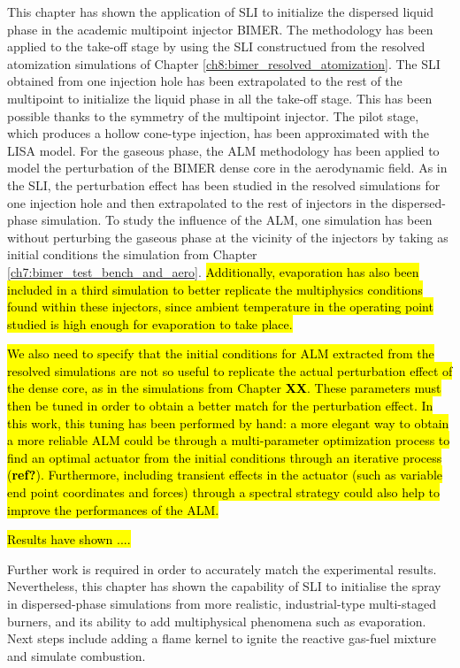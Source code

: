 This chapter has shown the application of SLI to initialize the dispersed liquid phase in the academic multipoint injector BIMER. The methodology has been applied to the take-off stage by using the SLI constructued from the resolved atomization simulations of Chapter \ref{ch8:bimer_resolved_atomization}. The SLI obtained from one injection hole has been extrapolated to the rest of the multipoint to initialize the liquid phase in all the take-off stage. This has been possible thanks to the symmetry of the multipoint injector. The pilot stage, which produces a hollow cone-type injection, has been approximated with the LISA 
model. For the gaseous phase, the ALM methodology has been applied to model the perturbation of the BIMER dense core in the aerodynamic field. As in the SLI, the perturbation effect has been studied in the resolved simulations for one injection hole and then extrapolated to the rest of injectors in the dispersed-phase simulation. To study the influence of the ALM, one simulation has been without perturbing the gaseous phase at the vicinity of the injectors by taking as initial conditions the simulation from Chapter \ref{ch7:bimer_test_bench_and_aero}. \hl{Additionally, evaporation has also been included in a third simulation to better replicate the multiphysics conditions found within these injectors, since ambient temperature in the operating point studied is high enough for evaporation to take place.}

\hl{We also need to specify that the initial conditions for ALM extracted from the resolved simulations are not so useful to replicate the actual perturbation effect of the dense core, as in the simulations from Chapter \textbf{XX}. These parameters must then be tuned in order to obtain a better match for the perturbation effect. In this work, this tuning has been performed by hand: a more elegant way to obtain a more reliable ALM could be through a multi-parameter optimization process to find an optimal actuator from the initial conditions through an iterative process (\textbf{ref?}). Furthermore, including transient effects in the actuator (such as variable end point coordinates and forces) through a spectral strategy could also help to improve the performances of the ALM.}

\hl{Results have shown ....}

Further work is required in order to accurately match the experimental results. Nevertheless, this chapter has shown the capability of SLI to initialise the spray in dispersed-phase simulations from more realistic, industrial-type multi-staged burners, and its ability to add multiphysical phenomena such as evaporation. Next steps include adding a flame kernel to ignite the reactive gas-fuel mixture and simulate combustion.


